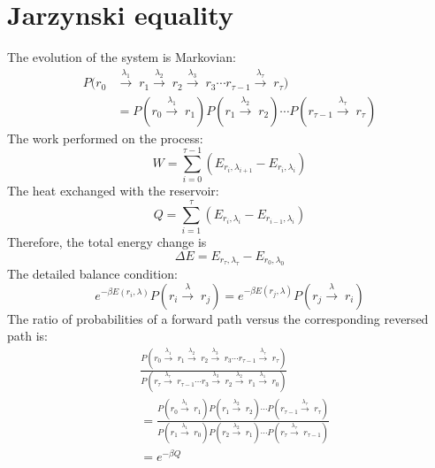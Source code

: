 \documentclass{article}
\begin{document}
\section{Jarzynski equality}
The evolution of the system is Markovian:
\begin{equation}
    \begin{split}
P(r_{0}&\xrightarrow{\lambda_{1}}\;r_{1}\xrightarrow{\lambda_{2}}\;r_{2}\xrightarrow{\lambda_{3}}\;r_{3}\cdots r_{\tau -1}\xrightarrow{\lambda_{\tau}}\;r_{\tau})\\
&=P(r_{0}\xrightarrow{\lambda_{1}}\;r_{1})P(r_{1}\xrightarrow{\lambda_{2}}\;r_{2})\cdots P(r_{\tau -1}\xrightarrow{\lambda_{\tau}}\;r_{\tau})
    \end{split}
\end{equation}
The work performed on the process:
\begin{equation}
    W=\sum_{i=0}^{\tau-1}(E_{r_{i},\lambda_{i+1}}-E_{r_{i},\lambda_{i}})
\end{equation}
The heat exchanged with the reservoir:
\begin{equation}
    Q=\sum_{i=1}^{\tau}(E_{r_{i},\lambda_{i}}-E_{r_{i-1},\lambda_{i}})
\end{equation}
Therefore, the total energy change is
\begin{equation}
    \Delta E=E_{r_{\tau},\lambda_{\tau}}-E_{r_{0},\lambda_{0}}
\end{equation}
The detailed balance condition:
\begin{equation}
e^{-\beta E(r_{i},\lambda)}P(r_{i}\xrightarrow{\lambda}\;r_{j})=e^{-\beta E(r_{j},\lambda)}P(r_{j}\xrightarrow{\lambda}\;r_{i})
\end{equation}
The ratio of probabilities of a forward path versus the corresponding reversed path is:
\begin{equation}
    \begin{aligned}
&\frac{P(r_{0}\xrightarrow{\lambda_{1}}\;r_{1}\xrightarrow{\lambda_{2}}\;r_{2}\xrightarrow{\lambda_{3}}\;r_{3}\cdots r_{\tau -1}\xrightarrow{\lambda_{\tau}}\;r_{\tau})}{P(r_{\tau}\xrightarrow{\lambda_{\tau}}\;r_{\tau-1}\cdots r_{3}\xrightarrow{\lambda_{3}}\;r_{2}\xrightarrow{\lambda_{2}}\;r_{1}\xrightarrow{\lambda_{1}}\;r_{0})}\\
&=\frac{P(r_{0}\xrightarrow{\lambda_{1}}\;r_{1})P(r_{1}\xrightarrow{\lambda_{2}}\;r_{2})\cdots P(r_{\tau -1}\xrightarrow{\lambda_{\tau}}\;r_{\tau})}{P(r_{1}\xrightarrow{\lambda_{1}}\;r_{0})P(r_{2}\xrightarrow{\lambda_{2}}\;r_{1})\cdots P(r_{\tau}\xrightarrow{\lambda_{\tau}}\;r_{\tau-1})}\\
&=e^{-\beta Q}
    \end{aligned}
\end{equation}
\end{document}

